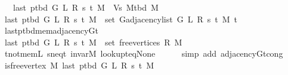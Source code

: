 \begin{isabellebody}
\ \ \ {\isachardoublequoteopen}last\ {\isacharparenleft}{\kern0pt}p{\isacharunderscore}{\kern0pt}tbd\ G\ L\ R\ s\ t\ M{\isacharparenright}{\kern0pt}\ {\isasymnotin}\ Vs\ {\isacharparenleft}{\kern0pt}M{\isacharunderscore}{\kern0pt}tbd\ M{\isacharparenright}{\kern0pt}{\isachardoublequoteclose}%
\endisataginvisible
{\isafoldinvisible}%
%
\isadeliminvisible
\isanewline
%
\endisadeliminvisible
%
\isadelimproof
%
\endisadelimproof
%
\isatagproof
{}\isamarkupfalse%
\ {\isacharminus}{\kern0pt}\isanewline
\ \ \isamarkupfalse%
\ {\isachardoublequoteopen}last\ {\isacharparenleft}{\kern0pt}p{\isacharunderscore}{\kern0pt}tbd\ G\ L\ R\ s\ t\ M{\isacharparenright}{\kern0pt}\ {\isasymin}\ set\ {\isacharparenleft}{\kern0pt}G{\isachardot}{\kern0pt}adjacency{\isacharunderscore}{\kern0pt}list\ {\isacharparenleft}{\kern0pt}G{}\ L\ R\ s\ t\ M{\isacharparenright}{\kern0pt}\ t{\isacharparenright}{\kern0pt}{\isachardoublequoteclose}\isanewline
\ \ \ \ \isamarkupfalse%
\ last{\isacharunderscore}{\kern0pt}p{\isacharunderscore}{\kern0pt}tbd{\isacharunderscore}{\kern0pt}mem{\isacharunderscore}{\kern0pt}adjacency{\isacharunderscore}{\kern0pt}G{}{\isacharunderscore}{\kern0pt}t\isanewline
\ \ \ \ \isacommand{{\isachardot}{\kern0pt}}\isamarkupfalse%
\isanewline
\ \ \isamarkupfalse%
\ {\isachardoublequoteopen}last\ {\isacharparenleft}{\kern0pt}p{\isacharunderscore}{\kern0pt}tbd\ G\ L\ R\ s\ t\ M{\isacharparenright}{\kern0pt}\ {\isasymin}\ set\ {\isacharparenleft}{\kern0pt}free{\isacharunderscore}{\kern0pt}vertices\ R\ M{\isacharparenright}{\kern0pt}{\isachardoublequoteclose}\isanewline
\ \ \ \ \isamarkupfalse%
\ t{\isacharunderscore}{\kern0pt}not{\isacharunderscore}{\kern0pt}mem{\isacharunderscore}{\kern0pt}L\ s{\isacharunderscore}{\kern0pt}neq{\isacharunderscore}{\kern0pt}t\ invar{\isacharunderscore}{\kern0pt}M\ lookup{\isacharunderscore}{\kern0pt}t{\isacharunderscore}{\kern0pt}eq{\isacharunderscore}{\kern0pt}None\isanewline
\ \ \ \ \isamarkupfalse%
\ {\isacharparenleft}{\kern0pt}simp\ add{\isacharcolon}{\kern0pt}\ adjacency{\isacharunderscore}{\kern0pt}G{}{\isacharunderscore}{\kern0pt}t{\isacharunderscore}{\kern0pt}cong{\isacharparenright}{\kern0pt}\isanewline
\ \ \isamarkupfalse%
\ {\isachardoublequoteopen}is{\isacharunderscore}{\kern0pt}free{\isacharunderscore}{\kern0pt}vertex\ M\ {\isacharparenleft}{\kern0pt}last\ {\isacharparenleft}{\kern0pt}p{\isacharunderscore}{\kern0pt}tbd\ G\ L\ R\ s\ t\ M{\isacharparenright}{\kern0pt}{\isacharparenright}{\kern0pt}{\isachardoublequoteclose}\isanewline

\end{isabellebody}
